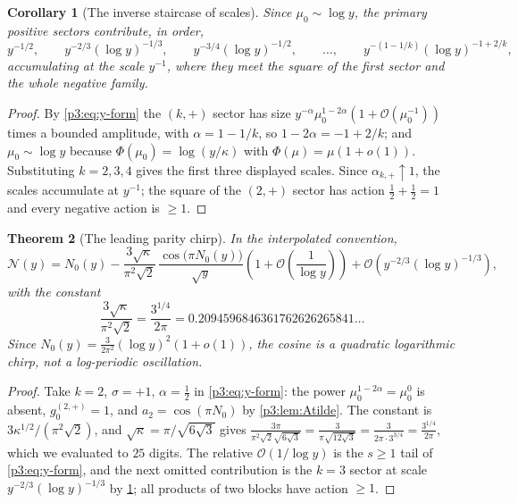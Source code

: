 \documentclass[11pt,a4paper,oneside]{book}
\theoremstyle{plain}
\newtheorem{theorem}{Theorem}[chapter]
\newtheorem{corollary}[theorem]{Corollary}
\theoremstyle{definition}
\theoremstyle{remark}
\newcommand{\bigO}{\mathcal{O}}
\newcommand{\littleo}{o}
\begin{document}
\begin{corollary}[The inverse staircase of scales]\label{p3:cor:staircase-scales}
Since $\mu_{0}\sim\log y$, the primary positive sectors contribute, in order,
\begin{equation}\label{p3:eq:scales}
 y^{-1/2},\qquad y^{-2/3}(\log y)^{-1/3},\qquad y^{-3/4}(\log y)^{-1/2},
 \qquad\dots,\qquad y^{-(1-1/k)}(\log y)^{-1+2/k},
\end{equation}
accumulating at the scale $y^{-1}$, where they meet the square of the first sector and the whole
negative family.
\end{corollary}

\begin{proof}
By \cref{p3:eq:y-form} the $(k,+)$ sector has size
$y^{-\alpha}\mu_{0}^{1-2\alpha}(1+\bigO(\mu_{0}^{-1}))$ times a bounded amplitude, with
$\alpha=1-1/k$, so $1-2\alpha=-1+2/k$; and $\mu_{0}\sim\log y$ because
$\Phi(\mu_{0})=\log(y/\kappa)$ with $\Phi(\mu)=\mu(1+\littleo(1))$. Substituting $k=2,3,4$ gives
the first three displayed scales. Since $\alpha_{k,+}\uparrow1$, the scales accumulate at
$y^{-1}$; the square of the $(2,+)$ sector has action $\tfrac12+\tfrac12=1$ and every negative
action is $\ge1$.
\end{proof}

\begin{theorem}[The leading parity chirp]\label{p3:thm:leading-chirp}
In the interpolated convention,
\begin{equation}\label{p3:eq:chirp}
 \mathcal{N}(y)=N_{0}(y)
 -\frac{3\sqrt\kappa}{\pi^{2}\sqrt2}\,\frac{\cos\bigl(\pi N_{0}(y)\bigr)}{\sqrt y}
 \left(1+\bigO\!\left(\frac1{\log y}\right)\right)
 +\bigO\!\left(y^{-2/3}(\log y)^{-1/3}\right),
\end{equation}
with the constant
\begin{equation}\label{p3:eq:chirp-constant}
 \frac{3\sqrt\kappa}{\pi^{2}\sqrt2}=\frac{3^{1/4}}{2\pi}
 =0.2094596846361762626265841\ldots
\end{equation}
Since $N_{0}(y)=\frac{3}{2\pi^{2}}(\log y)^{2}(1+\littleo(1))$, the cosine is a \emph{quadratic
logarithmic chirp}, not a log-periodic oscillation.
\end{theorem}

\begin{proof}
Take $k=2$, $\sigma=+1$, $\alpha=\tfrac12$ in \cref{p3:eq:y-form}: the power
$\mu_{0}^{1-2\alpha}=\mu_{0}^{0}$ is absent, $g^{(2,+)}_{0}=1$, and $a_{2}=\cos(\pi N_{0})$ by
\cref{p3:lem:Atilde}. The constant is $3\kappa^{1/2}/(\pi^{2}\sqrt2)$, and
$\sqrt\kappa=\pi/\sqrt{6\sqrt3}$ gives $\frac{3\pi}{\pi^{2}\sqrt2\sqrt{6\sqrt3}}
=\frac{3}{\pi\sqrt{12\sqrt3}}=\frac{3}{2\pi\cdot3^{3/4}}=\frac{3^{1/4}}{2\pi}$, which we evaluated
to $25$ digits. The relative $\bigO(1/\log y)$ is the $s\ge1$ tail of \cref{p3:eq:y-form},
and the next omitted contribution is the $k=3$ sector at scale $y^{-2/3}(\log y)^{-1/3}$ by
\cref{p3:cor:staircase-scales}; all products of two blocks have action $\ge1$.
\end{proof}
\end{document}
